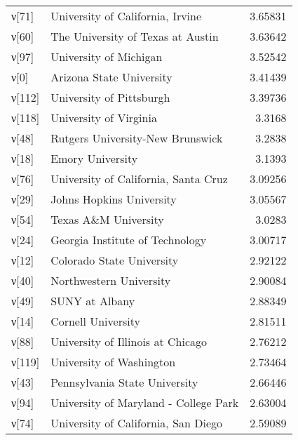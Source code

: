 \begin{tabular}{llr}
 ν[71]  & University of California, Irvine                               &  3.65831  \\
 ν[60]  & The University of Texas at Austin                              &  3.63642  \\
 ν[97]  & University of Michigan                                         &  3.52542  \\
 ν[0]   & Arizona State University                                       &  3.41439  \\
 ν[112] & University of Pittsburgh                                       &  3.39736  \\
 ν[118] & University of Virginia                                         &  3.3168   \\
 ν[48]  & Rutgers University-New Brunswick                               &  3.2838   \\
 ν[18]  & Emory University                                               &  3.1393   \\
 ν[76]  & University of California, Santa Cruz                           &  3.09256  \\
 ν[29]  & Johns Hopkins University                                       &  3.05567  \\
 ν[54]  & Texas A\&M University                                           &  3.0283   \\
 ν[24]  & Georgia Institute of Technology                                &  3.00717  \\
 ν[12]  & Colorado State University                                      &  2.92122  \\
 ν[40]  & Northwestern University                                        &  2.90084  \\
 ν[49]  & SUNY at Albany                                                 &  2.88349  \\
 ν[14]  & Cornell University                                             &  2.81511  \\
 ν[88]  & University of Illinois at Chicago                              &  2.76212  \\
 ν[119] & University of Washington                                       &  2.73464  \\
 ν[43]  & Pennsylvania State University                                  &  2.66446  \\
 ν[94]  & University of Maryland - College Park                          &  2.63004  \\
 ν[74]  & University of California, San Diego                            &  2.59089  \\

\end{tabular}
